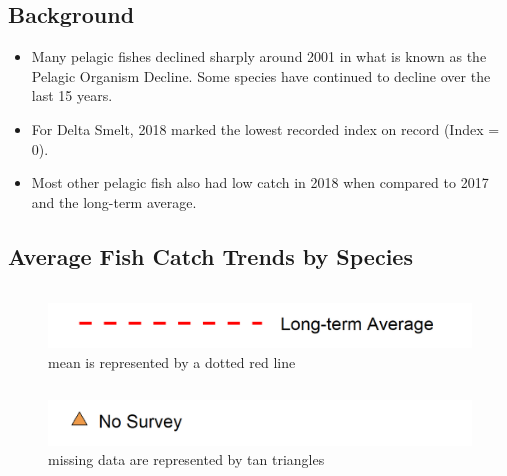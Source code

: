 \documentclass[
]{book}
\providecommand{\tightlist}{%
  \setlength{\itemsep}{0pt}\setlength{\parskip}{0pt}}
\begin{document}
\hypertarget{background-5}{%
\subsection{Background}\label{background-5}}

\begin{itemize}
\tightlist
\item
  Many pelagic fishes declined sharply around 2001 in what is known as the Pelagic Organism Decline. Some species have continued to decline over the last 15 years.
\item
  For Delta Smelt, 2018 marked the lowest recorded index on record (Index = 0).
\item
  Most other pelagic fish also had low catch in 2018 when compared to 2017 and the long-term average.
\end{itemize}

\hypertarget{average-fish-catch-trends-by-species-1}{%
\subsection{Average Fish Catch Trends by Species}\label{average-fish-catch-trends-by-species-1}}

\begin{columns-nocenter}

\begin{column}

\begin{figure}
\includegraphics[width=15.25in]{figures/mline} \caption{mean is represented by a dotted red line}\label{fig:unnamed-chunk-134}
\end{figure}

\end{column}

\begin{column}

\begin{figure}
\includegraphics[width=15.25in]{figures/mpoint} \caption{missing data are represented by tan triangles}\label{fig:unnamed-chunk-135}
\end{figure}

\end{column}

\begin{column}

\end{column}

\end{columns-nocenter}
\end{document}
